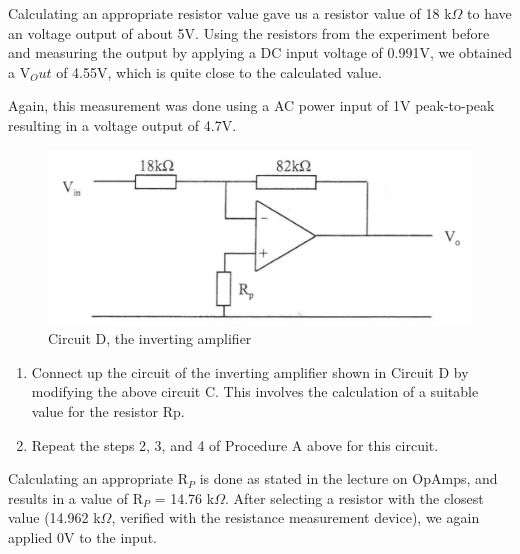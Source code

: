 Calculating an appropriate resistor value  gave us a resistor value of 18 k$\Omega$ to have an voltage output of about 5V.
Using the resistors from the experiment before and measuring the output by applying a DC input voltage of 0.991V, we obtained a V$_Out$ of 4.55V, which is quite close to the calculated value.

Again, this measurement was done using a AC power input of 1V peak-to-peak  resulting in a voltage output of 4.7V.





\begin{figure}[H] %
\begin{center}
\includegraphics[width=1\linewidth]{LabTwo/d}
\end{center}
\caption{Circuit D, the inverting amplifier}
\label{fig:2_inverting}
\end{figure}

\begin{enumerate}
	\item Connect up the circuit of the inverting amplifier shown in Circuit D by modifying the
above circuit C. This involves the calculation of a suitable value for the resistor Rp.
\item Repeat the steps 2, 3, and 4 of Procedure A above for this circuit.

\end{enumerate}

Calculating an appropriate R$_P$ is done as stated in the lecture on OpAmps, and results in a value of R$_P$ = 14.76 k$\Omega$. After selecting a resistor with the closest value (14.962 k$\Omega$, verified with the resistance measurement device), we again applied 0V to the input.

